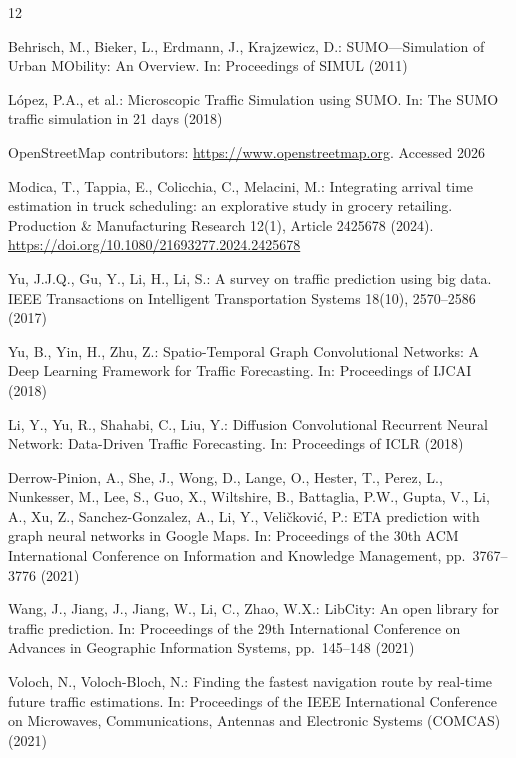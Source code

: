 \begin{thebibliography}{12}

Behrisch, M., Bieker, L., Erdmann, J., Krajzewicz, D.:
SUMO---Simulation of Urban MObility: An Overview.
In: Proceedings of SIMUL (2011)

L{\'o}pez, P.A., et al.:
Microscopic Traffic Simulation using SUMO.
In: The SUMO traffic simulation in 21 days (2018)

OpenStreetMap contributors: \url{https://www.openstreetmap.org}.
Accessed 2026

Modica, T., Tappia, E., Colicchia, C., Melacini, M.:
Integrating arrival time estimation in truck scheduling: an explorative study in grocery retailing.
Production \& Manufacturing Research 12(1), Article 2425678 (2024).
\url{https://doi.org/10.1080/21693277.2024.2425678}

Yu, J.J.Q., Gu, Y., Li, H., Li, S.:
A survey on traffic prediction using big data.
IEEE Transactions on Intelligent Transportation Systems 18(10), 2570--2586 (2017)

Yu, B., Yin, H., Zhu, Z.:
Spatio-Temporal Graph Convolutional Networks: A Deep Learning Framework for Traffic Forecasting.
In: Proceedings of IJCAI (2018)

Li, Y., Yu, R., Shahabi, C., Liu, Y.:
Diffusion Convolutional Recurrent Neural Network: Data-Driven Traffic Forecasting.
In: Proceedings of ICLR (2018)

Derrow-Pinion, A., She, J., Wong, D., Lange, O., Hester, T., Perez, L., Nunkesser, M., Lee, S., Guo, X., Wiltshire, B., Battaglia, P.W., Gupta, V., Li, A., Xu, Z., Sanchez-Gonzalez, A., Li, Y., Veli\v{c}kovi\'c, P.:
ETA prediction with graph neural networks in Google Maps.
In: Proceedings of the 30th ACM International Conference on Information and Knowledge Management, pp.\ 3767--3776 (2021)

Wang, J., Jiang, J., Jiang, W., Li, C., Zhao, W.X.:
LibCity: An open library for traffic prediction.
In: Proceedings of the 29th International Conference on Advances in Geographic Information Systems, pp.\ 145--148 (2021)

Voloch, N., Voloch-Bloch, N.:
Finding the fastest navigation route by real-time future traffic estimations.
In: Proceedings of the IEEE International Conference on Microwaves, Communications, Antennas and Electronic Systems (COMCAS) (2021)


\end{thebibliography}
